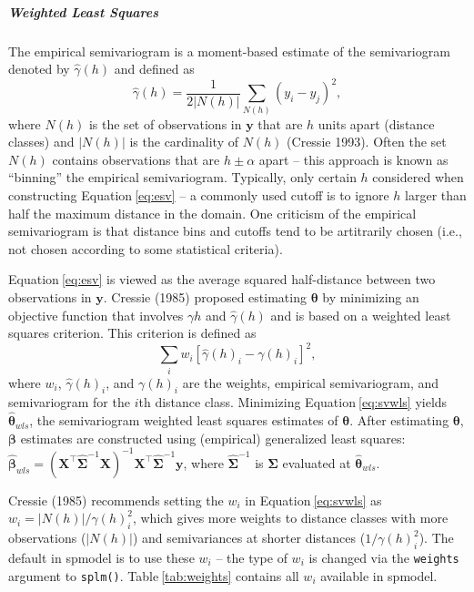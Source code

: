 \documentclass{article}
\begin{document}
\hypertarget{weighted-least-squares}{%
\subparagraph{Weighted Least Squares}\label{weighted-least-squares}}

The empirical semivariogram is a moment-based estimate of the
semivariogram denoted by \(\hat{\gamma}(h)\) and defined as
\begin{equation}\label{eq:esv}
  \hat{\gamma}(h) = \frac{1}{2|N(h)|} \sum_{N(h)} (y_i - y_j)^2, 
\end{equation} where \(N(h)\) is the set of observations in
\(\mathbf{y}\) that are \(h\) units apart (distance classes) and
\(|N(h)|\) is the cardinality of \(N(h)\) (Cressie 1993). Often the set
\(N(h)\) contains observations that are \(h \pm \alpha\) apart -- this
approach is known as ``binning'' the empirical semivariogram. Typically,
only certain \(h\) considered when constructing
Equation\(~\)\ref{eq:esv} -- a commonly used cutoff is to ignore \(h\)
larger than half the maximum distance in the domain. One criticism of
the empirical semivariogram is that distance bins and cutoffs tend to be
artitrarily chosen (i.e., not chosen according to some statistical
criteria).

Equation\(~\)\eqref{eq:esv} is viewed as the average squared
half-distance between two observations in \(\mathbf{y}\). Cressie (1985)
proposed estimating \(\bm{\theta}\) by minimizing an objective function
that involves \(\gamma{h}\) and \(\hat{\gamma}(h)\) and is based on a
weighted least squares criterion. This criterion is defined as
\begin{equation}\label{eq:svwls}
  \sum_i w_i [\hat{\gamma}(h)_i - \gamma(h)_i]^2,
\end{equation} where \(w_i\), \(\hat{\gamma}(h)_i\), and \(\gamma(h)_i\)
are the weights, empirical semivariogram, and semivariogram for the
\(i\)th distance class. Minimizing Equation\(~\)\eqref{eq:svwls} yields
\(\bm{\hat{\theta}}_{wls}\), the semivariogram weighted least squares
estimates of \(\bm{\theta}\). After estimating \(\bm{\theta}\),
\(\bm{\beta}\) estimates are constructed using (empirical) generalized
least squares:
\(\bm{\hat{\beta}}_{wls} = (\mathbf{X}^\intercal \hat{\mathbf{\Sigma}}^{-1} \mathbf{X})^{-1} \mathbf{X}^\intercal \hat{\mathbf{\Sigma}}^{-1} \mathbf{y}\),
where \(\hat{\mathbf{\Sigma}}^{-1}\) is \(\mathbf{\Sigma}\) evaluated at
\(\bm{\hat{\theta}}_{wls}\).

Cressie (1985) recommends setting the \(w_i\) in
Equation\(~\)\eqref{eq:svwls} as \(w_i = |N(h)| / \gamma(h)_i^2\), which
gives more weights to distance classes with more observations
(\(|N(h)|\)) and semivariances at shorter distances
(\(1 / \gamma(h)_i^2\)). The default in spmodel is to use these \(w_i\)
-- the type of \(w_i\) is changed via the \texttt{weights} argument to
\texttt{splm()}. Table\(~\)\ref{tab:weights} contains all \(w_i\)
available in spmodel.
\end{document}
